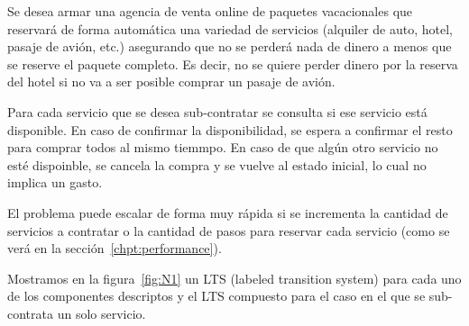 Se desea armar una agencia de venta online de paquetes vacacionales que reservará de forma automática una variedad de servicios (alquiler de auto, hotel, pasaje de avión, etc.) asegurando que no se perderá nada de dinero a menos que se reserve el paquete completo. Es decir, no se quiere perder dinero por la reserva del hotel si no va a ser posible comprar un pasaje de avión.

Para cada servicio que se desea sub-contratar se consulta si ese servicio está disponible. En caso de confirmar la disponibilidad, se espera a confirmar el resto para comprar todos al  mismo tiemmpo. En caso de que algún otro servicio no esté dispoinble, se cancela la compra y se vuelve al estado inicial, lo cual no implica un gasto.

El problema puede escalar de forma muy rápida si se incrementa la cantidad de servicios a contratar o la cantidad de pasos para reservar cada servicio (como se verá en la sección~\ref{chpt:performance}).

Mostramos en la figura~\ref{fig:N1} un LTS (labeled transition system) para cada uno de los componentes descriptos y el LTS compuesto para el caso en el que se sub-contrata un solo servicio.

